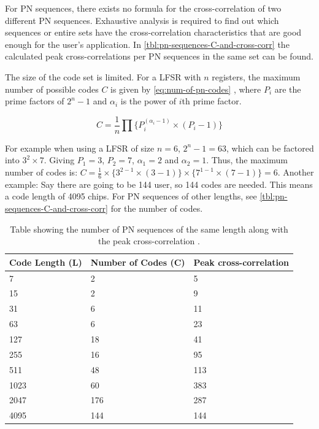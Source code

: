 For PN sequences, there exists no formula for the cross-correlation of two different PN sequences. 
Exhaustive analysis is required to find out which sequences or entire sets have the cross-correlation characteristics that are good enough for the user's application.
In \autoref{tbl:pn-sequences-C-and-cross-corr} the calculated peak cross-correlations per PN sequences in the same set can be found.



The size of the code set is limited.
For a LFSR with $n$ registers, the maximum number of possible codes $C$ is given by \autoref{eq:num-of-pn-codes} \cite{mutagi1996pseudo}, where $P_i$ are the prime factors of $2^n - 1$ and $\alpha_i$ is the power of $i$th prime factor.

\begin{equation}
	\label{eq:num-of-pn-codes}
	C = \frac{1}{n} \prod \{ P_{i} ^ {(\alpha_i - 1)} \times (P_i - 1) \}
\end{equation}

For example when using a LFSR of size $n = 6$, $2^n - 1 = 63$, which can be factored into $3^2 \times 7$.
Giving $P_1 = 3$, $P_2 = 7$, $\alpha_1 = 2$ and $\alpha_2 = 1$.
Thus, the maximum number of codes is: $C = \frac{1}{6} \times \{ 3^{2 - 1} \times (3 - 1) \} \times \{ 7^{1 - 1} \times (7 - 1) \} = 6$.
Another example: Say there are going to be 144 user, so 144 codes are needed. 
This means a code length of 4095 chips.
For PN sequences of other lengths, see \autoref{tbl:pn-sequences-C-and-cross-corr} for the number of codes.


\begin{table}[tbp]
	\centering
	\begin{tabular}{  | l | l | l | }

		\hline
		Code Length (L)	& Number of Codes (C) 	& Peak cross-correlation	\\ \hline
		
		7				& 2						& 5						\\ \hline					
		15				& 2						& 9						\\ \hline			
		31				& 6						& 11					\\ \hline			
		63				& 6						& 23					\\ \hline		
		127				& 18					& 41					\\ \hline		
		255				& 16					& 95					\\ \hline	
		511				& 48					& 113					\\ \hline	
		1023			& 60					& 383					\\ \hline		
		2047			& 176 					& 287					\\ \hline		
		4095			& 144					& 144					\\ \hline		


	\end{tabular}
	\caption{Table showing the number of PN sequences of the same length along with the peak cross-correlation \cite{kettunen1997code}. }
	\label{tbl:pn-sequences-C-and-cross-corr}

\end{table}


